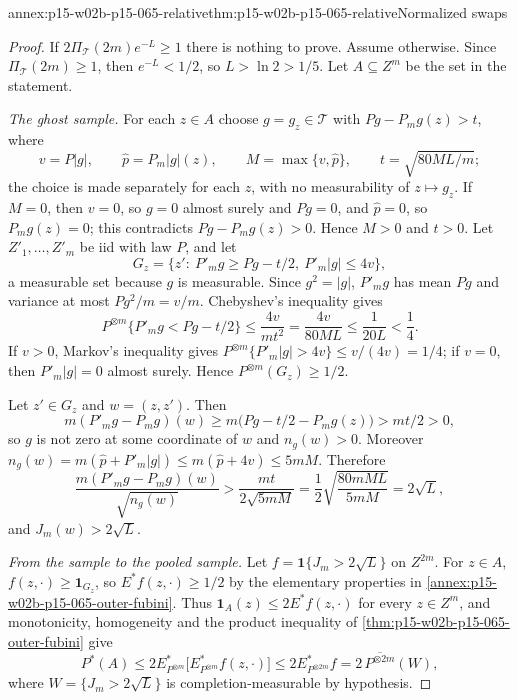 \begin{annexitem}{annex:p15-w02b-p15-065-relative}{thm:p15-w02b-p15-065-relative}{Normalized swaps}
\begin{proof}
If \(2\Pi_{\mathcal T}(2m)e^{-L}\geq1\) there is nothing to prove. Assume
otherwise. Since \(\Pi_{\mathcal T}(2m)\geq1\), then \(e^{-L}<1/2\), so
\(L>\ln2>1/5\). Let \(A\subseteq Z^m\) be the set in the statement.

\emph{The ghost sample.} For each \(z\in A\) choose \(g=g_z\in\mathcal T\)
with \(Pg-P_mg(z)>t\), where
\[
 v=P|g|,\qquad \widehat p=P_m|g|(z),\qquad M=\max\{v,\widehat p\},\qquad
 t=\sqrt{80ML/m};
\]
the choice is made separately for each \(z\), with no measurability of
\(z\mapsto g_z\). If \(M=0\), then \(v=0\), so \(g=0\) almost surely and
\(Pg=0\), and \(\widehat p=0\), so \(P_mg(z)=0\); this contradicts
\(Pg-P_mg(z)>0\). Hence \(M>0\) and \(t>0\). Let \(Z'_1,\ldots,Z'_m\) be
iid with law \(P\), and let
\[
 G_z=\bigl\{z':\ P'_mg\geq Pg-t/2,\ P'_m|g|\leq4v\bigr\},
\]
a measurable set because \(g\) is measurable. Since \(g^2=|g|\),
\(P'_mg\) has mean \(Pg\) and variance at most \(Pg^2/m=v/m\).
Chebyshev's inequality gives
\[
 P^{\otimes m}\{P'_mg<Pg-t/2\}\leq\frac{4v}{mt^2}=\frac{4v}{80ML}
 \leq\frac1{20L}<\frac14 .
\]
If \(v>0\), Markov's inequality gives
\(P^{\otimes m}\{P'_m|g|>4v\}\leq v/(4v)=1/4\); if \(v=0\), then
\(P'_m|g|=0\) almost surely. Hence \(P^{\otimes m}(G_z)\geq1/2\).

Let \(z'\in G_z\) and \(w=(z,z')\). Then
\[
 m(P'_mg-P_mg)(w)\geq m\bigl(Pg-t/2-P_mg(z)\bigr)>mt/2>0,
\]
so \(g\) is not zero at some coordinate of \(w\) and \(n_g(w)>0\).
Moreover \(n_g(w)=m(\widehat p+P'_m|g|)\leq m(\widehat p+4v)\leq5mM\).
Therefore
\[
 \frac{m(P'_mg-P_mg)(w)}{\sqrt{n_g(w)}}>\frac{mt}{2\sqrt{5mM}}
 =\frac12\sqrt{\frac{80mML}{5mM}}=2\sqrt L,
\]
and \(J_m(w)>2\sqrt L\).

\emph{From the sample to the pooled sample.} Let
\(f=\mathbf1\{J_m>2\sqrt L\}\) on \(Z^{2m}\). For \(z\in A\),
\(f(z,\cdot)\geq\mathbf1_{G_z}\), so \(E^{*}f(z,\cdot)\geq1/2\) by the
elementary properties in \cref{annex:p15-w02b-p15-065-outer-fubini}. Thus
\(\mathbf1_A(z)\leq2E^{*}f(z,\cdot)\) for every \(z\in Z^m\), and
monotonicity, homogeneity and the product inequality of
\cref{thm:p15-w02b-p15-065-outer-fubini} give
\[
 P^{*}(A)\leq2E^{*}_{P^{\otimes m}}\bigl[E^{*}_{P^{\otimes m}}f(z,\cdot)\bigr]
 \leq2E^{*}_{P^{\otimes2m}}f=2\,\overline{P^{\otimes2m}}(W),
\]
where \(W=\{J_m>2\sqrt L\}\) is completion-measurable by hypothesis.


\end{proof}
\end{annexitem}
